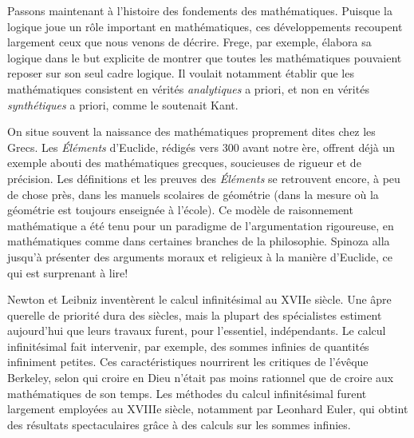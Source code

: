 \documentclass[../../../include/open-logic-section]{subfiles}
\begin{document}
Passons maintenant à l'histoire des fondements des mathématiques.
Puisque la logique joue un rôle important en mathématiques, ces
développements recoupent largement ceux que nous venons de décrire.
Frege, par exemple, élabora sa logique dans le but explicite de
montrer que toutes les mathématiques pouvaient reposer sur son seul
cadre logique. Il voulait notamment établir que les mathématiques
consistent en vérités \emph{analytiques} a priori, et non en
vérités \emph{synthétiques} a priori, comme le soutenait Kant.

On situe souvent la naissance des mathématiques proprement dites
chez les Grecs. Les \emph{Éléments} d'Euclide, rédigés vers 300 avant
notre ère, offrent déjà un exemple abouti des mathématiques
grecques, soucieuses de rigueur et de précision. Les définitions et
les preuves des \emph{Éléments} se retrouvent encore, à peu de
chose près, dans les manuels scolaires de géométrie (dans la mesure
où la géométrie est toujours enseignée à l'école). Ce modèle de
raisonnement mathématique a été tenu pour un paradigme de
l'argumentation rigoureuse, en mathématiques comme dans certaines
branches de la philosophie. Spinoza alla jusqu'à présenter des
arguments moraux et religieux à la manière d'Euclide, ce qui est
surprenant à lire!

Newton et Leibniz inventèrent le calcul infinitésimal au XVIIe
siècle. Une âpre querelle de priorité dura des siècles, mais la
plupart des spécialistes estiment aujourd'hui que leurs travaux
furent, pour l'essentiel, indépendants. Le calcul infinitésimal
fait intervenir, par exemple, des sommes infinies de quantités
infiniment petites. Ces caractéristiques nourrirent les critiques
de l'évêque Berkeley, selon qui croire en Dieu n'était pas moins
rationnel que de croire aux mathématiques de son temps. Les méthodes
du calcul infinitésimal furent largement employées au XVIIIe
siècle, notamment par Leonhard Euler, qui obtint des résultats
spectaculaires grâce à des calculs sur les sommes infinies.
\end{document}
